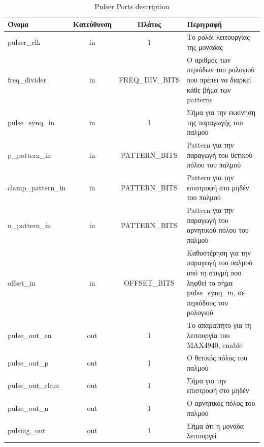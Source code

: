 \documentclass[12pt,a4paper]{book}
\begin{document}
\begin{table}
\begin{tabularx}{\linewidth}{|l|c|c|X|}
\hline 
Όνομα & Κατεύθυνση & Πλάτος & Περιγραφή \\ 
\hline 
\hline 
pulser\_clk & in & 1 & Το ρολόι λειτουργίας της μονάδας \\ 
\hline 
freq\_divider & in & FREQ\_DIV\_BITS & Ο αριθμός των περιόδων του ρολογιού που πρέπει να διαρκεί κάθε βήμα των patterns \\ 
\hline 
pulse\_synq\_in & in & 1 & Σήμα για την εκκίνηση της παραγωγής του παλμού \\ 
\hline 
p\_pattern\_in & in & PATTERN\_BITS & Pattern για την παραγωγή του θετικού πόλου του παλμού \\ 
\hline 
clamp\_pattern\_in & in & PATTERN\_BITS & Pattern για την επιστροφή στο μηδέν του παλμού \\ 
\hline 
n\_pattern\_in & in & PATTERN\_BITS & Pattern για την παραγωγή του αρνητικού πόλου του παλμού \\ 
\hline 
offset\_in & in & OFFSET\_BITS & Καθυστέρηση για την παραγωγή του παλμού από τη στιγμή που ληφθεί το σήμα pulse\_synq\_in, σε περιόδους του ρολογιού \\ 
\hline 
pulse\_out\_en & out & 1 & Το απαραίτητο για τη λειτουργία του MAX4940, enable \\ 
\hline 
pulse\_out\_p & out & 1 & Ο θετικός πόλος του παλμού \\ 
\hline 
pulse\_out\_clam & out & 1 & Σήμα για την επιστροφή στο μηδέν \\ 
\hline 
pulse\_out\_n & out & 1 & Ο αρνητικός πόλος του παλμού \\ 
\hline 
pulsing\_out & out & 1 & Σήμα ότι η μονάδα λειτουργεί \\ 
\hline 
\end{tabularx} 
\caption{Pulser Ports description}
\label{pulser_ports} 
\end{table} 
\end{document}
